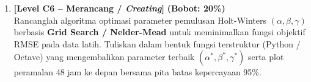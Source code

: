 \documentclass[11pt,a4paper]{article}
\begin{document}
\begin{enumerate}[leftmargin=1.5em, label=\textbf{Soal \arabic*.}]
    \vspace{0.4cm}

    \item \textbf{[Level C6 -- Merancang / \textit{Creating}]} \hfill \textbf{(Bobot: 20\%)} \\
    Rancanglah algoritma optimasi parameter pemulusan Holt-Winters $(\alpha, \beta, \gamma)$ berbasis \textbf{Grid Search / Nelder-Mead} untuk meminimalkan fungsi objektif RMSE pada data latih. Tuliskan dalam bentuk fungsi terstruktur (Python / Octave) yang mengembalikan parameter terbaik $(\alpha^*, \beta^*, \gamma^*)$ serta plot peramalan 48 jam ke depan bersama pita batas kepercayaan 95\%.
\end{enumerate}
\end{document}
